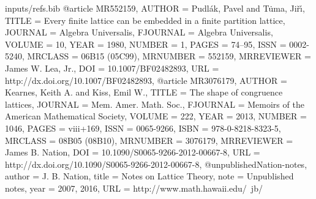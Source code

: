\begin{filecontents*}{inputs/refs.bib}
@article {MR552159,
    AUTHOR = {Pudl{\'a}k, Pavel and T{\.u}ma, Ji{\v{r}}{\'{\i}}},
     TITLE = {Every finite lattice can be embedded in a finite partition
              lattice},
   JOURNAL = {Algebra Universalis},
  FJOURNAL = {Algebra Universalis},
    VOLUME = {10},
      YEAR = {1980},
    NUMBER = {1},
     PAGES = {74--95},
      ISSN = {0002-5240},
   MRCLASS = {06B15 (05C99)},
  MRNUMBER = {552159},
MRREVIEWER = {James W. Lea, Jr.},
       DOI = {10.1007/BF02482893},
       URL = {http://dx.doi.org/10.1007/BF02482893},
}
@article {MR3076179,
    AUTHOR = {Kearnes, Keith A. and Kiss, Emil W.},
     TITLE = {The shape of congruence lattices},
   JOURNAL = {Mem. Amer. Math. Soc.},
  FJOURNAL = {Memoirs of the American Mathematical Society},
    VOLUME = {222},
      YEAR = {2013},
    NUMBER = {1046},
     PAGES = {viii+169},
      ISSN = {0065-9266},
      ISBN = {978-0-8218-8323-5},
   MRCLASS = {08B05 (08B10)},
  MRNUMBER = {3076179},
MRREVIEWER = {James B. Nation},
       DOI = {10.1090/S0065-9266-2012-00667-8},
       URL = {http://dx.doi.org/10.1090/S0065-9266-2012-00667-8},
}
@unpublished{Nation-notes,
author = {J. B. Nation},
title = {Notes on Lattice Theory},
note = {Unpublished notes},
year = {2007, 2016},
URL = {http://www.math.hawaii.edu/~jb/}
}
\end{filecontents*}
\documentclass[12pt]{amsart}

